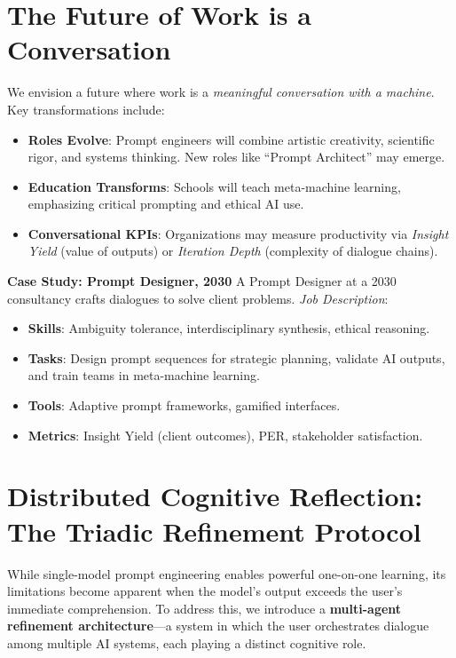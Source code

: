 \documentclass{article}
\begin{document}
\section{The Future of Work is a Conversation}
We envision a future where work is a \emph{meaningful conversation with a machine}. Key transformations include:
\begin{itemize}
    \item \textbf{Roles Evolve}: Prompt engineers will combine artistic creativity, scientific rigor, and systems thinking. New roles like ``Prompt Architect'' may emerge.
    \item \textbf{Education Transforms}: Schools will teach meta-machine learning, emphasizing critical prompting and ethical AI use.
    \item \textbf{Conversational KPIs}: Organizations may measure productivity via \emph{Insight Yield} (value of outputs) or \emph{Iteration Depth} (complexity of dialogue chains).
\end{itemize}

\textbf{Case Study: Prompt Designer, 2030}  
A Prompt Designer at a 2030 consultancy crafts dialogues to solve client problems. \emph{Job Description}:  
\begin{itemize}
    \item \textbf{Skills}: Ambiguity tolerance, interdisciplinary synthesis, ethical reasoning.  
    \item \textbf{Tasks}: Design prompt sequences for strategic planning, validate AI outputs, and train teams in meta-machine learning.  
    \item \textbf{Tools}: Adaptive prompt frameworks, gamified interfaces.  
    \item \textbf{Metrics}: Insight Yield (client outcomes), PER, stakeholder satisfaction.
\end{itemize}

\section{Distributed Cognitive Reflection: The Triadic Refinement Protocol}

While single-model prompt engineering enables powerful one-on-one learning, its limitations become apparent when the model's output exceeds the user's immediate comprehension. To address this, we introduce a \textbf{multi-agent refinement architecture}—a system in which the user orchestrates dialogue among multiple AI systems, each playing a distinct cognitive role.
\end{document}
